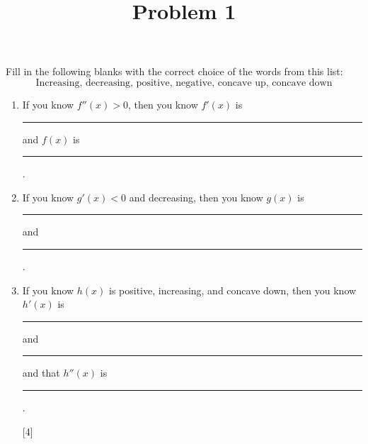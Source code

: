 \documentclass{ximera}
\title[Problem 1]{Problem 1}
\begin{document}
\begin{abstract} \end{abstract}
\maketitle

\begin{problem}
Fill in the following blanks with the correct choice of the words from this list:
$$ \text{Increasing, decreasing, positive, negative, concave up, concave down} $$

	\begin{enumerate}
	
	\item  If you know $f''(x) > 0$, then you know $f'(x)$ is \rule{2in}{0.7mm} and $f(x)$ is \rule{2in}{0.7mm}.

	\item  If you know $g'(x) < 0$ and decreasing, then you know $g(x)$ is \rule{2in}{0.7mm} and \rule{2in}{0.7mm}.

	\item  If you know $h(x)$ is positive, increasing, and concave down, then you know $h'(x)$ is \rule{2in}{0.7mm} and \rule{2in}{0.7mm} and that $h''(x)$ is \rule{2in}{0.7mm}.

[4]			

	\end{enumerate}	
		
\end{problem}
\end{document}
